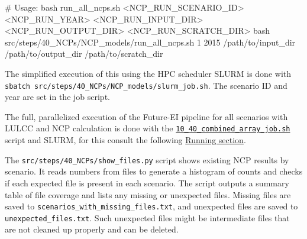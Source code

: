 \documentclass[
  letterpaper,
  DIV=11,
  numbers=noendperiod]{scrreprt}
\newenvironment{Shaded}{\begin{snugshade}}{\end{snugshade}}
\newcommand{\CommentTok}[1]{\textcolor[rgb]{0.37,0.37,0.37}{#1}}
\newcommand{\FunctionTok}[1]{\textcolor[rgb]{0.28,0.35,0.67}{#1}}
\newcommand{\NormalTok}[1]{\textcolor[rgb]{0.00,0.23,0.31}{#1}}
\begin{document}
\begin{Shaded}
\begin{Highlighting}[]
\CommentTok{\# Usage: bash run\_all\_ncps.sh \textless{}NCP\_RUN\_SCENARIO\_ID\textgreater{} \textless{}NCP\_RUN\_YEAR\textgreater{} \textless{}NCP\_RUN\_INPUT\_DIR\textgreater{} \textless{}NCP\_RUN\_OUTPUT\_DIR\textgreater{} \textless{}NCP\_RUN\_SCRATCH\_DIR\textgreater{}}
\FunctionTok{bash}\NormalTok{ src/steps/40\_NCPs/NCP\_models/run\_all\_ncps.sh 1 2015 /path/to/input\_dir /path/to/output\_dir /path/to/scratch\_dir}
\end{Highlighting}
\end{Shaded}

The simplified execution of this using the HPC scheduler SLURM is done
with \texttt{sbatch\ src/steps/40\_NCPs/NCP\_models/slurm\_job.sh}. The
scenario ID and year are set in the job script.

The full, parallelized execution of the Future-EI pipeline for all
scenarios with LULCC and NCP calculation is done with the
\href{https://github.com/cbueth/Future-EI/tree/main/src/steps/10_40_combined_array_job.sh}{\texttt{10\_40\_combined\_array\_job.sh}}
script and SLURM, for this consult the following
\href{running.html}{Running section}.

\begin{tcolorbox}[enhanced jigsaw, breakable, bottomrule=.15mm, toprule=.15mm, rightrule=.15mm, opacitybacktitle=0.6, title=\textcolor{quarto-callout-note-color}{\faInfo}\hspace{0.5em}{NCP output check}, coltitle=black, colback=white, titlerule=0mm, toptitle=1mm, left=2mm, bottomtitle=1mm, colbacktitle=quarto-callout-note-color!10!white, colframe=quarto-callout-note-color-frame, opacityback=0, leftrule=.75mm, arc=.35mm]

The \texttt{src/steps/40\_NCPs/show\_files.py} script shows existing NCP
results by scenario. It reads numbers from files to generate a histogram
of counts and checks if each expected file is present in each scenario.
The script outputs a summary table of file coverage and lists any
missing or unexpected files. Missing files are saved to
\texttt{scenarios\_with\_missing\_files.txt}, and unexpected files are
saved to \texttt{unexpected\_files.txt}. Such unexpected files might be
intermediate files that are not cleaned up properly and can be deleted.

\end{tcolorbox}

\end{document}
